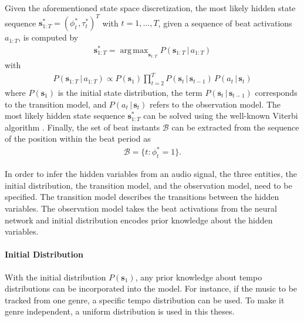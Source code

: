 \documentclass{scrartcl}
\DeclareMathOperator*{\argmax}{arg\,max}
\begin{document}
Given the aforementioned state space discretization, the most likely hidden state sequence $\mathbf s_{1:T}^* = (\phi_t^*, \tau_t^*)^T$ with $t=1,\dots,T$, given a sequence of beat activations $a_{1:T}$, is computed by
\begin{align}
\mathbf s_{1:T}^* = \argmax_{\mathbf s_{1:T}} P(\mathbf s_{1:T}\,|\, a_{1:T})
\label{eq:most_likely_states}
\end{align} 
with 
\begin{align}
 P(\mathbf s_{1:T}\,|\, a_{1:T}) \propto P(\mathbf s_1) \prod_{t=2}^T P(\mathbf s_t\,|\,\mathbf s_{t-1})\, P( a_t\,|\,\mathbf s_{t})
\end{align} 
where $P(\mathbf s_1)$ is the initial state distribution, the term $P(\mathbf s_t\,|\,\mathbf s_{t-1})$ corresponds to the transition model, and $P(a_t\,|\,\mathbf s_{t})$ refers to the observation model. The most likely hidden state sequence $\mathbf s_{1:T}^*$ can be solved using the well-known Viterbi algorithm \cite{Viterbi1967}. Finally, the set of beat instants $\mathcal B$ can be extracted from the sequence of the position within the beat period as
\begin{align}
\mathcal B = \{ t: \phi_t^*=1\}.
\end{align} 

In order to infer the hidden variables from an audio signal, the three entities, the initial distribution,  the transition model, and the observation model, need to be  specified. The transition model describes the transitions between the hidden variables. The observation model takes the beat activations from the neural network
and initial distribution encodes prior knowledge about the hidden variables.

\paragraph{Initial Distribution} 
With the initial distribution $P(\mathbf s_1)$, any prior knowledge about tempo distributions can be incorporated into the model. For instance, if the music to be tracked from one genre, a specific tempo distribution can be used. To make it genre independent, a uniform distribution is used in this theses. 
\end{document}
